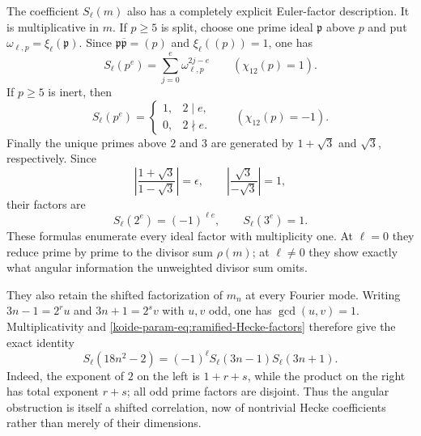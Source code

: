 The coefficient $S_\ell(m)$ also has a completely explicit Euler-factor
description.  It is multiplicative in $m$.  If $p\geq5$ is split, choose
one prime ideal $\mathfrak p$ above $p$ and put
$\omega_{\ell,p}=\xi_\ell(\mathfrak p)$.  Since
$\mathfrak p\overline{\mathfrak p}=(p)$ and
$\xi_\ell((p))=1$, one has
\begin{equation}
 S_\ell(p^e)=\sum_{j=0}^{e}\omega_{\ell,p}^{2j-e}
 \qquad(\chi_{12}(p)=1).
 \label{koide-param-eq:split-Hecke-factor}
\end{equation}
If $p\geq5$ is inert, then
\begin{equation}
 S_\ell(p^e)=
 \begin{cases}1,&2\mid e,\\0,&2\nmid e.
 \end{cases}
 \qquad(\chi_{12}(p)=-1).
 \label{koide-param-eq:inert-Hecke-factor}
\end{equation}
Finally the unique primes above $2$ and $3$ are generated by
$1+\sqrt3$ and $\sqrt3$, respectively.  Since
\[
 \left|\frac{1+\sqrt3}{1-\sqrt3}\right|=\epsilon,
 \qquad
 \left|\frac{\sqrt3}{-\sqrt3}\right|=1,
\]
their factors are
\begin{equation}
 S_\ell(2^e)=(-1)^{\ell e},
 \qquad S_\ell(3^e)=1.
 \label{koide-param-eq:ramified-Hecke-factors}
\end{equation}
These formulas enumerate every ideal factor with multiplicity one.  At
$\ell=0$ they reduce prime by prime to the divisor sum $\rho(m)$; at
$\ell\ne0$ they show exactly what angular information the unweighted
divisor sum omits.

They also retain the shifted factorization of $m_n$ at every Fourier mode.
Writing $3n-1=2^r u$ and $3n+1=2^s v$ with $u,v$ odd, one has
$\gcd(u,v)=1$.  Multiplicativity and
\eqref{koide-param-eq:ramified-Hecke-factors} therefore give the exact identity
\begin{equation}
 S_\ell(18n^2-2)
 =(-1)^\ell S_\ell(3n-1)S_\ell(3n+1).
 \label{koide-param-eq:shifted-Hecke-factorization}
\end{equation}
Indeed, the exponent of $2$ on the left is $1+r+s$, while the product on
the right has total exponent $r+s$; all odd prime factors are disjoint.
Thus the angular obstruction is itself a shifted correlation, now of
nontrivial Hecke coefficients rather than merely of their dimensions.

